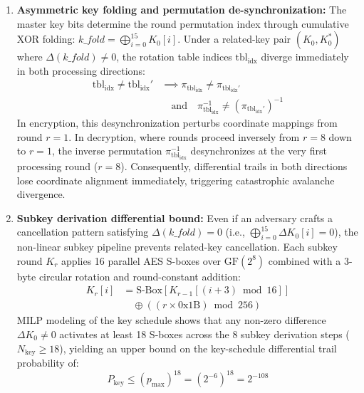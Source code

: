 \documentclass[10pt,twocolumn]{article}
\begin{document}
\begin{enumerate}
    \item \textbf{Asymmetric key folding and permutation de-synchronization:} The master key bits determine the round permutation index through cumulative XOR folding: $\mathit{k\_fold} = \bigoplus_{i=0}^{15} K_0[i]$. Under a related-key pair $(K_0, K_0^*)$ where $\Delta(\mathit{k\_fold}) \neq 0$, the rotation table indices $\text{tbl}_{\text{idx}}$ diverge immediately in both processing directions:
    \begin{equation}
    \begin{aligned}
        \text{tbl}_{\text{idx}} \neq \text{tbl}_{\text{idx}}' &\implies \pi_{\text{tbl}_{\text{idx}}} \neq \pi_{\text{tbl}_{\text{idx}}'} \\
        &\quad \text{and} \quad \pi_{\text{tbl}_{\text{idx}}}^{-1} \neq (\pi_{\text{tbl}_{\text{idx}}'})^{-1}
    \end{aligned}
    \end{equation}
    In encryption, this desynchronization perturbs coordinate mappings from round $r=1$. In decryption, where rounds proceed inversely from $r=8$ down to $r=1$, the inverse permutation $\pi_{\text{tbl}_{\text{idx}}}^{-1}$ desynchronizes at the very first processing round ($r=8$). Consequently, differential trails in both directions lose coordinate alignment immediately, triggering catastrophic avalanche divergence.
    
    \item \textbf{Subkey derivation differential bound:} Even if an adversary crafts a cancellation pattern satisfying $\Delta(\mathit{k\_fold}) = 0$ (i.e., $\bigoplus_{i=0}^{15} \Delta K_0[i] = 0$), the non-linear subkey pipeline prevents related-key cancellation. Each subkey round $K_r$ applies 16 parallel AES S-boxes over $\text{GF}(2^8)$ combined with a 3-byte circular rotation and round-constant addition:
    \begin{equation}
    \begin{aligned}
        K_r[i] &= \text{S-Box}\left[K_{r-1}[(i+3) \bmod 16]\right] \\
        &\quad \oplus \left((r \times \text{0x1B}) \bmod 256\right)
    \end{aligned}
    \end{equation}
    MILP modeling of the key schedule shows that any non-zero difference $\Delta K_0 \neq 0$ activates at least 18 S-boxes across the 8 subkey derivation steps ($N_{\text{key}} \ge 18$), yielding an upper bound on the key-schedule differential trail probability of:
    \begin{equation}
        P_{\text{key}} \le (p_{\max})^{18} = (2^{-6})^{18} = 2^{-108}
    \end{equation}
    

\end{enumerate}
\end{document}
